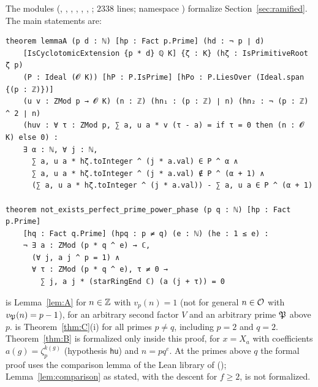 The modules  (, ,
, , ,
, ; $2338$ lines; namespace
) formalize
Section~\ref{sec:ramified}. The main statements are:
\begin{Verbatim}[fontsize=\footnotesize]
theorem lemmaA (p d : ℕ) [hp : Fact p.Prime] (hd : ¬ p ∣ d)
    [IsCyclotomicExtension {p * d} ℚ K] {ζ : K} (hζ : IsPrimitiveRoot ζ p)
    (P : Ideal (𝓞 K)) [hP : P.IsPrime] [hPo : P.LiesOver (Ideal.span {(p : ℤ)})]
    (u v : ZMod p → 𝓞 K) (n : ℤ) (hn₁ : (p : ℤ) ∣ n) (hn₂ : ¬ (p : ℤ) ^ 2 ∣ n)
    (huv : ∀ τ : ZMod p, ∑ a, u a * v (τ - a) = if τ = 0 then (n : 𝓞 K) else 0) :
    ∃ α : ℕ, ∀ j : ℕ,
      ∑ a, u a * hζ.toInteger ^ (j * a.val) ∈ P ^ α ∧
      ∑ a, u a * hζ.toInteger ^ (j * a.val) ∉ P ^ (α + 1) ∧
      (∑ a, u a * hζ.toInteger ^ (j * a.val)) - ∑ a, u a ∈ P ^ (α + 1)

theorem not_exists_perfect_prime_power_phase (p q : ℕ) [hp : Fact p.Prime]
    [hq : Fact q.Prime] (hpq : p ≠ q) (e : ℕ) (he : 1 ≤ e) :
    ¬ ∃ a : ZMod (p * q ^ e) → ℂ,
      (∀ j, a j ^ p = 1) ∧
      ∀ τ : ZMod (p * q ^ e), τ ≠ 0 →
        ∑ j, a j * (starRingEnd ℂ) (a (j + τ)) = 0
\end{Verbatim}
\noindent {} is Lemma~\ref{lem:A} for $n\in\mathbb{Z}$ with
$v_p(n)=1$ (not for general $n\in\mathcal{O}$ with $v_{\mathfrak{P}}(n)=p-1$), for an
arbitrary second factor $V$ and an arbitrary prime $\mathfrak{P}$ above $p$.
 is Theorem~\ref{thm:C}(i)
for all primes $p\ne q$, including $p=2$ and $q=2$. Theorem~\ref{thm:B}
is formalized only inside this proof, for $x=X_a$ with coefficients
$a(g)=\zeta_p^{k(g)}$ (hypothesis \texttt{hu}) and $n=pq^e$. At the
primes above $q$ the formal proof uses the comparison lemma of the Lean
library of \cite{OpenAI2026} ();
Lemma~\ref{lem:comparison} as stated, with the descent for $f\ge2$, is
not formalized.

